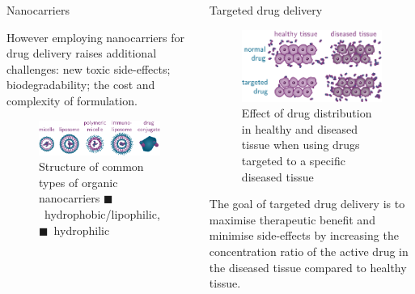 \documentclass[final]{beamer}
\begin{document}
\begin{frame}[plain]
\begin{columns}[t,onlytextwidth]
\begin{block}{Nanocarriers\strut}
\begin{multicols}{2}
          However employing nanocarriers for drug delivery raises additional challenges: new \alert{toxic side-effects}; \alert{biodegradability}; the \alert{cost} and \alert{complexity} of formulation.

          \begin{figure}[t]
            \centering
            \includegraphics[scale=2.4]{tikz/nanocarrier_types.pdf}
            \caption{Structure of common types of organic nanocarriers
              \textcolor{palatinate!}{$\blacksquare$~hydrophobic/lipophilic},
              \textcolor{blue-palatinate!}{$\blacksquare$~hydrophilic}}
            \label{fig:types}
          \end{figure}

        \end{multicols}
        \vspace{2.5ex}
      \end{block}

      \begin{block}{Targeted drug delivery\strut}

        \begin{figure}
          \centering
          \includegraphics[scale=2.4]{tikz/targeted_drug_delivery.pdf}
          \caption{Effect of drug distribution in healthy and diseased tissue when using drugs targeted to a specific diseased tissue}
        \end{figure}

        The goal of targeted drug delivery is to \alert{maximise therapeutic benefit} and \alert{minimise side-effects} by increasing the concentration ratio of the active drug in the diseased tissue compared to healthy tissue.


\end{block}
\end{columns}
\end{frame}
\end{document}
